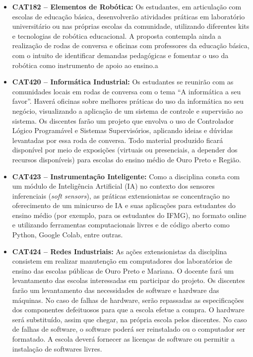 \documentclass[
	12pt,				%
	openright,			%
	oneside,			%
	a4paper,			%
	english,			%
	brazil				%
	]{abntex2}
\begin{document}
\begin{itemize}
    \item \textbf{CAT182 -- Elementos de Robótica:} Os estudantes, em articulação com escolas de educação básica, desenvolverão atividades práticas em laboratório universitário ou nas próprias escolas da comunidade, utilizando diferentes kits e tecnologias de robótica educacional. A proposta contempla ainda a realização de rodas de conversa e oficinas com professores da educação básica, com o intuito de identificar demandas pedagógicas e fomentar o uso da robótica como instrumento de apoio ao ensino.a

    \item \textbf{CAT420 -- Informática Industrial:} Os estudantes se reunirão com as comunidades locais em rodas de conversa com o tema “A informática a seu favor”. Haverá oficinas sobre melhores práticas do uso da informática no seu negócio, visualizando a aplicação de um sistema de controle e supervisão ao sistema. Os discentes farão um projeto que envolva o uso de Controlador Lógico Programável e Sistemas Supervisórios, aplicando ideias e dúvidas levantadas por essa roda de conversa. Todo material produzido ficará disponível por meio de exposições (virtuais ou presenciais, a depender dos recursos disponíveis) para escolas do ensino médio de Ouro Preto e Região.

    \item \textbf{CAT423 -- Instrumentação Inteligente:} Como a disciplina consta com um módulo de Inteligência Artificial (IA) no contexto dos sensores inferenciais (\textit{soft sensors}), as práticas extensionistas se concentração no oferecimento de um minicurso de IA e suas aplicações para estudantes do ensino médio (por exemplo, para os estudantes do IFMG), no formato online e utilizando ferramentas computacionais livres e de código aberto como Python, Google Colab, entre outras.

    \item \textbf{CAT424 -- Redes Industriais:} As ações extensionistas da disciplina consistem em realizar manutenção em computadores dos laboratórios de ensino das escolas públicas de Ouro Preto e Mariana. O docente fará um levantamento das escolas interessadas em participar do projeto. Os discentes farão um levantamento das necessidades de software e hardware das máquinas. No caso de falhas de hardware, serão repassadas as especificações dos componentes defeituosos para que a escola efetue a compra. O hardware será substituído, assim que chegar, na própria escola pelos discentes. No caso de falhas de software, o software poderá ser reinstalado ou o computador ser formatado. A escola deverá fornecer as licenças de software ou permitir a instalação de softwares livres.


\end{itemize}
\end{document}

